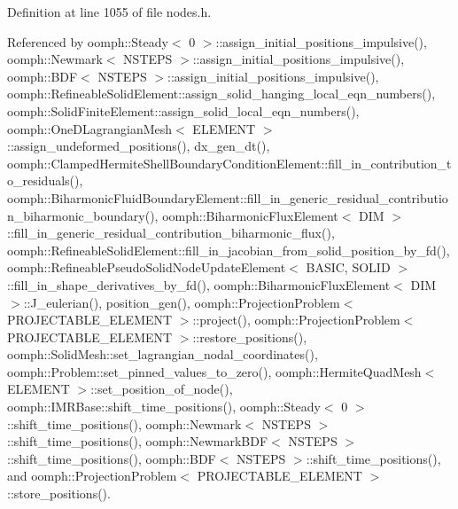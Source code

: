Definition at line 1055 of file nodes.\+h.



Referenced by oomph\+::\+Steady$<$ 0 $>$\+::assign\+\_\+initial\+\_\+positions\+\_\+impulsive(), oomph\+::\+Newmark$<$ N\+S\+T\+E\+P\+S $>$\+::assign\+\_\+initial\+\_\+positions\+\_\+impulsive(), oomph\+::\+B\+D\+F$<$ N\+S\+T\+E\+P\+S $>$\+::assign\+\_\+initial\+\_\+positions\+\_\+impulsive(), oomph\+::\+Refineable\+Solid\+Element\+::assign\+\_\+solid\+\_\+hanging\+\_\+local\+\_\+eqn\+\_\+numbers(), oomph\+::\+Solid\+Finite\+Element\+::assign\+\_\+solid\+\_\+local\+\_\+eqn\+\_\+numbers(), oomph\+::\+One\+D\+Lagrangian\+Mesh$<$ E\+L\+E\+M\+E\+N\+T $>$\+::assign\+\_\+undeformed\+\_\+positions(), dx\+\_\+gen\+\_\+dt(), oomph\+::\+Clamped\+Hermite\+Shell\+Boundary\+Condition\+Element\+::fill\+\_\+in\+\_\+contribution\+\_\+to\+\_\+residuals(), oomph\+::\+Biharmonic\+Fluid\+Boundary\+Element\+::fill\+\_\+in\+\_\+generic\+\_\+residual\+\_\+contribution\+\_\+biharmonic\+\_\+boundary(), oomph\+::\+Biharmonic\+Flux\+Element$<$ D\+I\+M $>$\+::fill\+\_\+in\+\_\+generic\+\_\+residual\+\_\+contribution\+\_\+biharmonic\+\_\+flux(), oomph\+::\+Refineable\+Solid\+Element\+::fill\+\_\+in\+\_\+jacobian\+\_\+from\+\_\+solid\+\_\+position\+\_\+by\+\_\+fd(), oomph\+::\+Refineable\+Pseudo\+Solid\+Node\+Update\+Element$<$ B\+A\+S\+I\+C, S\+O\+L\+I\+D $>$\+::fill\+\_\+in\+\_\+shape\+\_\+derivatives\+\_\+by\+\_\+fd(), oomph\+::\+Biharmonic\+Flux\+Element$<$ D\+I\+M $>$\+::\+J\+\_\+eulerian(), position\+\_\+gen(), oomph\+::\+Projection\+Problem$<$ P\+R\+O\+J\+E\+C\+T\+A\+B\+L\+E\+\_\+\+E\+L\+E\+M\+E\+N\+T $>$\+::project(), oomph\+::\+Projection\+Problem$<$ P\+R\+O\+J\+E\+C\+T\+A\+B\+L\+E\+\_\+\+E\+L\+E\+M\+E\+N\+T $>$\+::restore\+\_\+positions(), oomph\+::\+Solid\+Mesh\+::set\+\_\+lagrangian\+\_\+nodal\+\_\+coordinates(), oomph\+::\+Problem\+::set\+\_\+pinned\+\_\+values\+\_\+to\+\_\+zero(), oomph\+::\+Hermite\+Quad\+Mesh$<$ E\+L\+E\+M\+E\+N\+T $>$\+::set\+\_\+position\+\_\+of\+\_\+node(), oomph\+::\+I\+M\+R\+Base\+::shift\+\_\+time\+\_\+positions(), oomph\+::\+Steady$<$ 0 $>$\+::shift\+\_\+time\+\_\+positions(), oomph\+::\+Newmark$<$ N\+S\+T\+E\+P\+S $>$\+::shift\+\_\+time\+\_\+positions(), oomph\+::\+Newmark\+B\+D\+F$<$ N\+S\+T\+E\+P\+S $>$\+::shift\+\_\+time\+\_\+positions(), oomph\+::\+B\+D\+F$<$ N\+S\+T\+E\+P\+S $>$\+::shift\+\_\+time\+\_\+positions(), and oomph\+::\+Projection\+Problem$<$ P\+R\+O\+J\+E\+C\+T\+A\+B\+L\+E\+\_\+\+E\+L\+E\+M\+E\+N\+T $>$\+::store\+\_\+positions().

\mbox{\label{classoomph_1_1Node_a81992a5a987a9ce239269febaeacdb1b}} 
